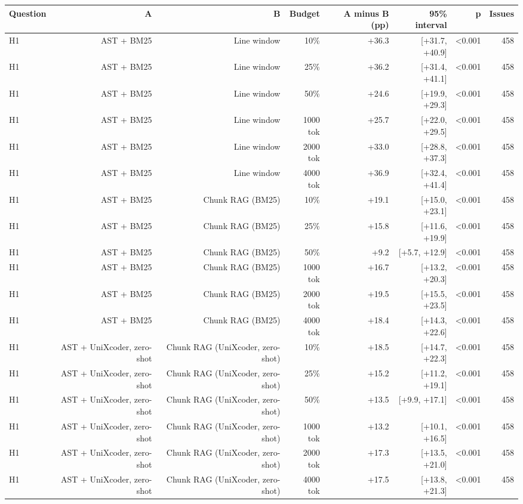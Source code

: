 \begin{tabular}{lrrrrrrr}
\toprule
Question & A & B & Budget & A minus B (pp) & 95\% interval & p & Issues \\
\midrule
H1 & AST + BM25 & Line window & 10\% & +36.3 & [+31.7, +40.9] & <0.001 & 458 \\
H1 & AST + BM25 & Line window & 25\% & +36.2 & [+31.4, +41.1] & <0.001 & 458 \\
H1 & AST + BM25 & Line window & 50\% & +24.6 & [+19.9, +29.3] & <0.001 & 458 \\
H1 & AST + BM25 & Line window & 1000 tok & +25.7 & [+22.0, +29.5] & <0.001 & 458 \\
H1 & AST + BM25 & Line window & 2000 tok & +33.0 & [+28.8, +37.3] & <0.001 & 458 \\
H1 & AST + BM25 & Line window & 4000 tok & +36.9 & [+32.4, +41.4] & <0.001 & 458 \\
H1 & AST + BM25 & Chunk RAG (BM25) & 10\% & +19.1 & [+15.0, +23.1] & <0.001 & 458 \\
H1 & AST + BM25 & Chunk RAG (BM25) & 25\% & +15.8 & [+11.6, +19.9] & <0.001 & 458 \\
H1 & AST + BM25 & Chunk RAG (BM25) & 50\% & +9.2 & [+5.7, +12.9] & <0.001 & 458 \\
H1 & AST + BM25 & Chunk RAG (BM25) & 1000 tok & +16.7 & [+13.2, +20.3] & <0.001 & 458 \\
H1 & AST + BM25 & Chunk RAG (BM25) & 2000 tok & +19.5 & [+15.5, +23.5] & <0.001 & 458 \\
H1 & AST + BM25 & Chunk RAG (BM25) & 4000 tok & +18.4 & [+14.3, +22.6] & <0.001 & 458 \\
H1 & AST + UniXcoder, zero-shot & Chunk RAG (UniXcoder, zero-shot) & 10\% & +18.5 & [+14.7, +22.3] & <0.001 & 458 \\
H1 & AST + UniXcoder, zero-shot & Chunk RAG (UniXcoder, zero-shot) & 25\% & +15.2 & [+11.2, +19.1] & <0.001 & 458 \\
H1 & AST + UniXcoder, zero-shot & Chunk RAG (UniXcoder, zero-shot) & 50\% & +13.5 & [+9.9, +17.1] & <0.001 & 458 \\
H1 & AST + UniXcoder, zero-shot & Chunk RAG (UniXcoder, zero-shot) & 1000 tok & +13.2 & [+10.1, +16.5] & <0.001 & 458 \\
H1 & AST + UniXcoder, zero-shot & Chunk RAG (UniXcoder, zero-shot) & 2000 tok & +17.3 & [+13.5, +21.0] & <0.001 & 458 \\
H1 & AST + UniXcoder, zero-shot & Chunk RAG (UniXcoder, zero-shot) & 4000 tok & +17.5 & [+13.8, +21.3] & <0.001 & 458 \\

\end{tabular}
